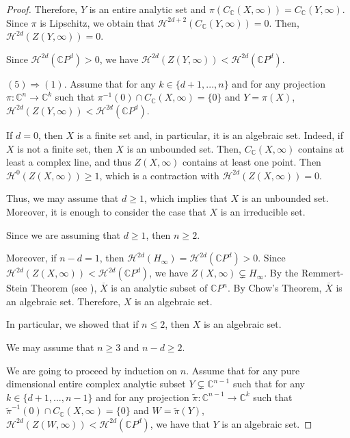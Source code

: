\documentclass[a4paper,11pt]{amsart}
\newcommand{\C}{\mathbb C}
\begin{document}
\begin{proof}
Therefore, $Y$ is an entire analytic set and $\pi(C_{\C}(X,\infty))=C_{\C}(Y,\infty)$. Since $\pi$ is Lipschitz, we obtain that $\mathcal{H}^{2d+2}(C_{\C}(Y,\infty))=0$. Then, $\mathcal{H}^{2d}(Z(Y,\infty))=0$.

Since $\mathcal{H}^{2d}(\mathbb{C}P^{d})>0$, we have $\mathcal{H}^{2d}(Z(Y,\infty))<\mathcal{H}^{2d}(\mathbb{C}P^{d})$.

\bigskip

\noindent $(5) \Longrightarrow (1)$. Assume that for any $k\in\{d+1,...,n\}$ and for any projection $\pi\colon \mathbb{C}^{n}\to \mathbb{C}^{k}$ such that $\pi^{-1}(0)\cap C_{\mathbb{C}}(X,\infty)=\{0\}$ and $Y=\pi(X)$, $\mathcal{H}^{2d}(Z(Y,\infty))<\mathcal{H}^{2d}(\mathbb{C}P^{d})$.



If $d=0$, then $X$ is a finite set and, in particular, it is an algebraic set. Indeed, if $X$ is not a finite set, then $X$ is an unbounded set. Then, $C_{\C}(X,\infty)$ contains at least a complex line, and thus $Z(X,\infty)$ contains at least one point. Then $\mathcal{H}^{0}(Z(X,\infty))\geq 1$, which is a contraction with $\mathcal{H}^{2d}(Z(X,\infty))=0$.

Thus, we may assume that $d\geq 1$, which implies that $X$ is an unbounded set.
Moreover, it is enough to consider the case that $X$ is an irreducible set.

Since we are assuming that $d\geq 1$, then $n\geq 2$.

Moreover, if $n-d=1$, then $\mathcal{H}^{2d}(H_{\infty})=\mathcal{H}^{2d}(\mathbb{C}P^{d})>0$. Since $\mathcal{H}^{2d}(Z(X,\infty))<\mathcal{H}^{2d}(\mathbb{C}P^{d})$, we have $Z(X,\infty)\subsetneq H_{\infty}$.
By the Remmert-Stein Theorem (see \cite[Theorem 4.6]{Shiffman:1971}), $\overline{X}$ is an analytic subset of $\C P^n$. By Chow's Theorem, $\overline{X}$ is an algebraic set. Therefore, $X$ is an algebraic set. 



In particular, we showed that if $n\leq 2$, then $X$ is an algebraic set.

We may assume that $n\geq 3$ and $n-d\geq 2$.

We are going to proceed by induction on $n$. Assume that for any pure dimensional entire complex analytic subset $Y\subsetneq \C^{n-1}$ such that for any $k\in\{d+1,...,n-1\}$ and for any projection $\tilde\pi\colon \mathbb{C}^{n-1}\to \mathbb{C}^{k}$ such that $\tilde\pi^{-1}(0)\cap C_{\mathbb{C}}(X,\infty)=\{0\}$ and $W=\tilde\pi(Y)$, $\mathcal{H}^{2d}(Z(W,\infty))<\mathcal{H}^{2d}(\mathbb{C}P^{d})$, we have that $Y$ is an algebraic set.
 


\end{proof}
\end{document}
